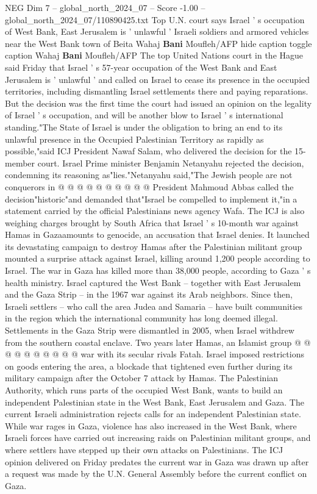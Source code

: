 \begin{textsample}{NEG Dim 7 – global\_north\_2024\_07 – Score -1.00 – global\_north\_2024\_07/110890425.txt}  \label{ex:f7_neg_406}
Top U.N. court says Israel ' s occupation of West Bank, East Jerusalem is ' unlawful ' Israeli soldiers and armored vehicles near the West Bank town of Beita Wahaj \textbf{Bani} Moufleh/AFP hide caption toggle caption Wahaj \textbf{Bani} Moufleh/AFP The top United Nations court in the Hague said Friday that Israel ' s 57-year occupation of the West Bank and East Jerusalem is ' unlawful ' and called on Israel to cease its presence in the occupied territories, including dismantling Israel settlements there and paying reparations.
But the decision was the first time the court had issued an opinion on the legality of Israel ' s occupation, and will be another blow to Israel ' s international standing."The State of Israel is under the obligation to bring an end to its unlawful presence in the Occupied Palestinian Territory as rapidly as possible,"said ICJ President Nawaf Salam, who delivered the decision for the 15-member court.
Israel Prime minister Benjamin Netanyahu rejected the decision, condemning its reasoning as"lies."Netanyahu said,"The Jewish people are not conquerors in @ @ @ @ @ @ @ @ @ @ President Mahmoud Abbas called the decision"historic"and demanded that"Israel be compelled to implement it,"in a statement carried by the official Palestinians news agency Wafa.
The ICJ is also weighing charges brought by South Africa that Israel ' s 10-month war against Hamas in Gazaamounts to genocide, an accusation that Israel denies.
It launched its devastating campaign to destroy Hamas after the Palestinian militant group mounted a surprise attack against Israel, killing around 1,200 people according to Israel.
The war in Gaza has killed more than 38,000 people, according to Gaza ' s health ministry.
Israel captured the West Bank -- together with East Jerusalem and the Gaza Strip -- in the 1967 war against its Arab neighbors.
Since then, Israeli settlers -- who call the area Judea and Samaria -- have built communities in the region which the international community has long deemed illegal.
Settlements in the Gaza Strip were dismantled in 2005, when Israel withdrew from the southern coastal enclave.
Two years later Hamas, an Islamist group @ @ @ @ @ @ @ @ @ @ war with its secular rivals Fatah.
Israel imposed restrictions on goods entering the area, a blockade that tightened even further during its military campaign after the October 7 attack by Hamas.
The Palestinian Authority, which runs parts of the occupied West Bank, wants to build an independent Palestinian state in the West Bank, East Jerusalem and Gaza.
The current Israeli administration rejects calls for an independent Palestinian state.
While war rages in Gaza, violence has also increased in the West Bank, where Israeli forces have carried out increasing raids on Palestinian militant groups, and where settlers have stepped up their own attacks on Palestinians.
The ICJ opinion delivered on Friday predates the current war in Gaza was drawn up after a request was made by the U.N.
General Assembly before the current conflict on Gaza.

\end{textsample}
